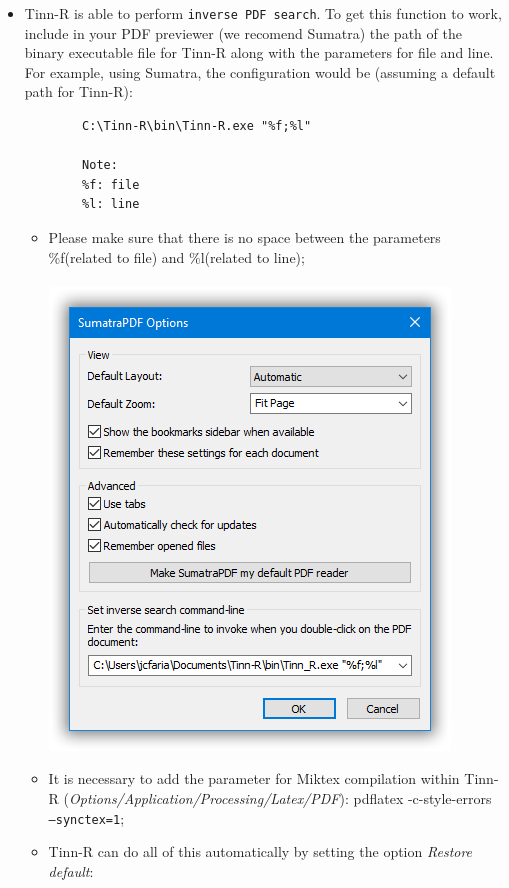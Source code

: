 \begin{itemize}
  \item Tinn-R is able to perform \texttt{inverse PDF search}. To get this
    function to work, include in your PDF previewer (we recomend Sumatra) the path of the
    binary executable file for Tinn-R along with the parameters for
    file and line.  For example, using Sumatra, the configuration
    would be (assuming a default path for Tinn-R):

    \begin{footnotesize}
      \begin{verbatim}
        C:\Tinn-R\bin\Tinn-R.exe "%f;%l"
        
        Note:
        %f: file
        %l: line
      \end{verbatim}
    \end{footnotesize}

    \begin{itemize}
      \item Please make sure that there is no space between the
        parameters \%f(related to file) and \%l(related to line);\\\\
        \includegraphics[scale=0.80]{./res/sumatra.png}\\
      \item It is necessary to add the parameter for Miktex compilation
        within Tinn-R (\textit{Options/Application/Processing/Latex/PDF}):
        pdflatex -c-style-errors \texttt{ --synctex=1};
      \item Tinn-R can do all of this automatically by setting the
        option \textit{Restore default}:


\end{itemize}
\end{itemize}
